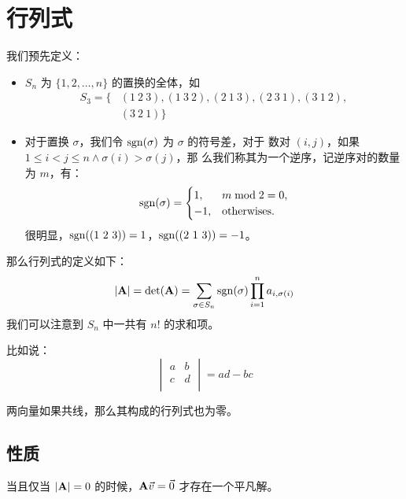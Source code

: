 \section{行列式} \label{sec:行列式}
我们预先定义：
\begin{itemize}
    \item $S_n$ 为 $\{1, 2, \ldots, n\}$ 的置换的全体，如 
        $$
        \begin{aligned}
            S_3 =  \{&(1\ 2\ 3), (1\ 3\ 2), (2\ 1\ 3), (2\ 3\ 1), (3\ 1\ 2), \\
                     &(3\ 2\ 1)\}
        \end{aligned}
        $$
    \item 对于置换 $\sigma$，我们令 $\mathrm{sgn}(\sigma)$ 为 $\sigma$ 的符号差，对于
        数对 $(i, j)$，如果 $1 \le i < j \le n \land \sigma(i) > \sigma(j)$，那
        么我们称其为一个逆序，记逆序对的数量为 $m$，有：
        $$
        \mathrm{sgn}(\sigma) = \begin{cases}
            1,  & m \bmod 2 = 0,     \\
            -1, & \text{otherwises}. \\
        \end{cases}
        $$
        很明显，$\mathrm{sgn}((1\ 2\ 3)) = 1$，$\mathrm{sgn}((2\ 1\ 3)) = -1$。
\end{itemize}

那么行列式的定义如下：
$$
|\mathbf{A}| = \mathrm{det}(\mathbf{A}) = \sum_{\sigma \in S_n}\mathrm{sgn}(\sigma) \prod_{i=1}^n a_{i, \sigma(i)}
$$
我们可以注意到 $S_n$ 中一共有 $n!$ 的求和项。

比如说：
\[
    \begin{vmatrix}    
        a & b \\
        c & d \\
    \end{vmatrix}
    = 
    a d - b c
\]

两向量如果共线，那么其构成的行列式也为零。

\subsection{性质} \label{subsec:行列式的性质}
当且仅当 $|\mathbf{A}| = 0$ 的时候，$\mathbf{A} \vec v = \vec 0$ 才存在一个平凡解。
